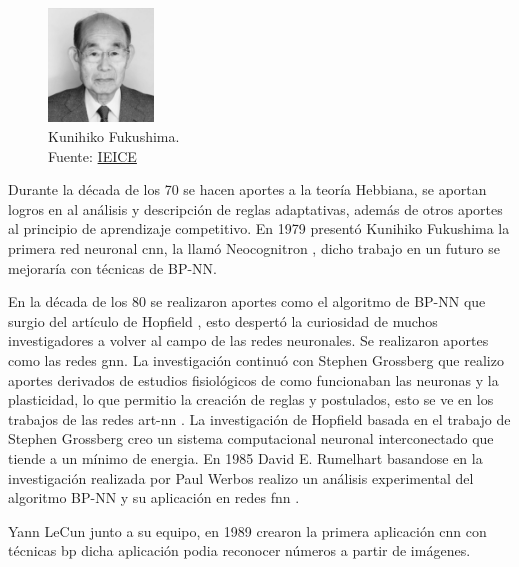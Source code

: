 \begin{figure}[H]
  \centering
  \includegraphics[width=0.25\textwidth]{figures/Kunihiko Fukushima.jpg}
  \caption{Kunihiko Fukushima. \\Fuente: \href{https://www.ieice.org/eng/about_ieice/new_honorary_members_award_winners/2017/meiyo_05e.html}{IEICE}}
  \label{fig:kunihiko-fukushima}
\end{figure}

Durante la década de los 70 se hacen aportes a la teoría Hebbiana, se aportan logros en al análisis y descripción de reglas adaptativas, además de otros aportes al principio de aprendizaje competitivo.
En 1979 presentó {Kunihiko Fukushima} la primera red neuronal \acrshort{cnn}, la llamó Neocognitron \cite{fukushima1979neural}, dicho trabajo en un futuro se mejoraría con técnicas de \gls{BP-NN}.


En la década de los 80 se realizaron aportes como el algoritmo de \gls{BP-NN} que surgio del artículo de {Hopfield} \cite{hopfield1982neural}, esto despertó la curiosidad de muchos investigadores a volver al campo de las redes neuronales.
Se realizaron aportes como las redes \acrshort{gnn}.
La investigación continuó con {Stephen Grossberg} que realizo aportes derivados de estudios fisiológicos de como funcionaban las neuronas y la plasticidad, lo que permitio la creación de reglas y postulados, esto se ve en los trabajos de las redes \acrshort{art-nn} \cite{grossberg1987competitive}.
La investigación de {Hopfield} basada en el trabajo de {Stephen Grossberg} creo un sistema computacional neuronal interconectado que tiende a un mínimo de energia.
En 1985 {David E. Rumelhart} basandose en la investigación realizada por {Paul Werbos} \cite{etde_5080493} realizo un análisis experimental del algoritmo \gls{BP-NN} y su aplicación en redes \acrshort{fnn} \cite{rumelhart1985learning}.

{Yann LeCun} junto a su equipo, en 1989 crearon la primera aplicación \acrshort{cnn} con técnicas \acrshort{bp} dicha aplicación podia reconocer números a partir de imágenes.

